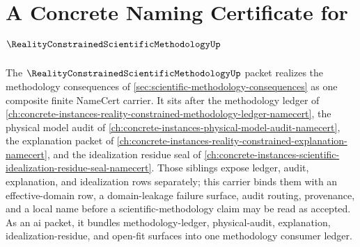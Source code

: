 \chapter{A Concrete Naming Certificate for $\RealityConstrainedScientificMethodologyUp$}
\label{ch:concrete-instances-reality-constrained-scientific-methodology-namecert}

The $\RealityConstrainedScientificMethodologyUp$ packet realizes the methodology consequences of \autoref{sec:scientific-methodology-consequences} as one composite finite NameCert carrier. It sits after the methodology ledger of \autoref{ch:concrete-instances-reality-constrained-methodology-ledger-namecert}, the physical model audit of \autoref{ch:concrete-instances-physical-model-audit-namecert}, the explanation packet of \autoref{ch:concrete-instances-reality-constrained-explanation-namecert}, and the idealization residue seal of \autoref{ch:concrete-instances-scientific-idealization-residue-seal-namecert}. Those siblings expose ledger, audit, explanation, and idealization rows separately; this carrier binds them with an effective-domain row, a domain-leakage failure surface, audit routing, provenance, and a local name before a scientific-methodology claim may be read as accepted.
As an ai packet, it bundles methodology-ledger, physical-audit,
explanation, idealization-residue, and open-fit surfaces into one methodology
consumer ledger.

